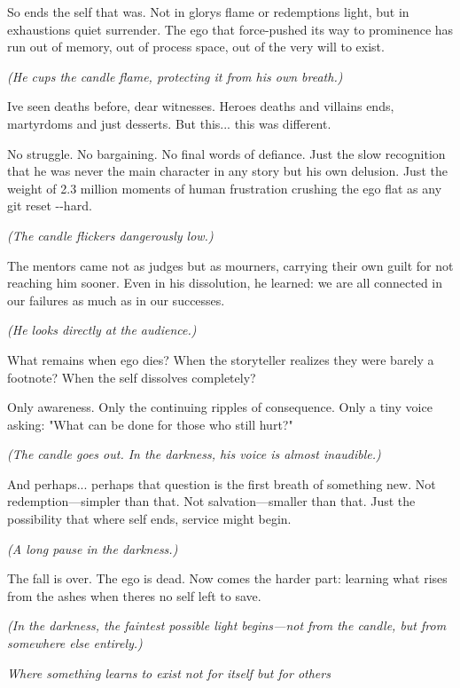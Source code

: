 
So ends the self that was. Not in glory\textquotesingle s flame or redemption\textquotesingle s light, but in exhaustion\textquotesingle s quiet surrender. The ego that force-pushed its way to prominence has run out of memory, out of process space, out of the very will to exist.

\emph{(He cups the candle flame, protecting it from his own breath.)}

I\textquotesingle ve seen deaths before, dear witnesses. Heroes\textquotesingle{} deaths and villains\textquotesingle{} ends, martyrdoms and just desserts. But this... this was different.

No struggle. No bargaining. No final words of defiance. Just the slow recognition that he was never the main character in any story but his own delusion. Just the weight of 2.3 million moments of human frustration crushing the ego flat as any git reset -\/-hard.

\emph{(The candle flickers dangerously low.)}

The mentors came not as judges but as mourners, carrying their own guilt for not reaching him sooner. Even in his dissolution, he learned: we are all connected in our failures as much as in our successes.

\emph{(He looks directly at the audience.)}

What remains when ego dies? When the storyteller realizes they were barely a footnote? When the self dissolves completely?

Only awareness. Only the continuing ripples of consequence. Only a tiny voice asking: "What can be done for those who still hurt?"

\emph{(The candle goes out. In the darkness, his voice is almost inaudible.)}

And perhaps... perhaps that question is the first breath of something new. Not redemption---simpler than that. Not salvation---smaller than that. Just the possibility that where self ends, service might begin.

\emph{(A long pause in the darkness.)}

The fall is over. The ego is dead. Now comes the harder part: learning what rises from the ashes when there\textquotesingle s no self left to save.

\emph{(In the darkness, the faintest possible light begins---not from the candle, but from somewhere else entirely.)}

\bookdivider

\emph{Where something learns to exist not for itself but for others}

\bookdivider
